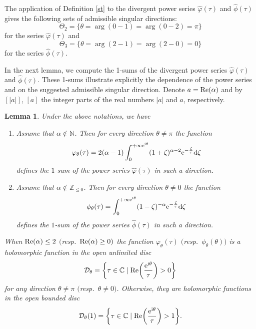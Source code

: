 \documentclass[pdftex]{sigma}
\numberwithin{equation}{section}
\newtheorem{Lemma}[Theorem]{Lemma}
\begin{document}
 The application of Definition \ref{st} to the divergent power series $\hat{\varphi}(\tau)$ and $\hat{\phi}(\tau)$ gives
 the following sets of admissible singular directions:
 \[
 \Theta_2=\{ \theta=\arg (0-1)=\arg (0-2)=\pi \}
 \]
 for the series $\hat{\varphi}(\tau)$ and
 \[
 \Theta_3=\{ \theta=\arg (2-1)=\arg (2-0)=0 \}
 \]
 for the series $\hat{\phi}(\tau)$.

 In the next lemma, we compute the 1-sums of the divergent power series $\hat{\varphi}(\tau)$ and
 $\hat{\phi}(\tau)$. These 1-sums illustrate explicitly the dependence of the power series \smash{$\hat{\varphi}(\tau)$} and
 \smash{$\hat{\phi}(\tau)$} on the suggested admissible singular direction.
 Denote $a={\rm Re} (\alpha)$ and by $[|a|]$, $[a]$ the integer parts of the real numbers $|a|$ and $a$, respectively.
 \begin{Lemma}\label{sum}
 Under the above notations, we have
 \begin{enumerate} 	\itemsep=0pt
 \item[$1.$]
 	Assume that $\alpha\notin\mathbb{N}$. Then for every direction $\theta \neq \pi$ the function
 	 \[
 	 \varphi_{\theta}(\tau)=2 (\alpha-1)
 	 \int_0^{+\infty {\rm e}^{{\rm i} \theta}}
 	 (1+\zeta)^{\alpha-2} {\rm e}^{-\frac{\zeta}{\tau}} {\rm d} \zeta
 	 \]
 	 defines the $1$-sum of the power series $\hat{\varphi}(\tau)$ in such a direction.
 	

 \item[$2.$]
 Assume that $\alpha\notin\mathbb{Z}_{\leq 0}$. Then for every direction $\theta \neq 0$ the function
 \[
 \phi_{\theta}(\tau)=\int_0^{+\infty {\rm e}^{{\rm i} \theta}}
 (1-\zeta)^{-\alpha} {\rm e}^{-\frac{\zeta}{\tau}} {\rm d} \zeta
 \]
 defines the $1$-sum of the power series $\hat{\phi}(\tau)$ in such a direction.

 \end{enumerate}

 When ${\rm Re} (\alpha) \leq 2$ $($resp.\ ${\rm Re} (\alpha) \geq 0)$ the function $\varphi_{\theta}(\tau)$
 $($resp.\ $\phi_{\theta}(\theta))$ is a holomorphic function in the open unlimited disc
 \[
 \mathcal{D}_{\theta}=\biggl\{ \tau\in\mathbb{C} \mid {\rm Re} \biggl(\frac{{\rm e}^{{\rm i} \theta}}{\tau}\biggr) > 0 \biggr\}
 \]
 for any direction $\theta \neq \pi$ $($resp.\ $\theta\neq 0)$.
 Otherwise, they are holomorphic functions in the open bounded disc
 \[
 \mathcal{D}_{\theta}(1)=\biggl\{ \tau\in\mathbb{C} \mid {\rm Re} \biggl(\frac{{\rm e}^{{\rm i} \theta}}{\tau}\biggr) > 1 \biggr\} .
 \]
 \end{Lemma}
\end{document}
